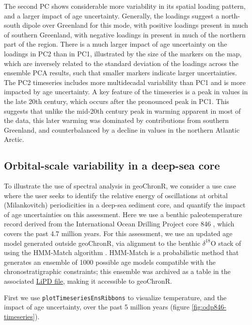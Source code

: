 \documentclass[gchron, manuscript]{copernicus}
\begin{document}
The second PC shows considerable more variability in its spatial loading pattern, and a larger impact of age uncertainty.
Generally, the loadings suggest a north-south dipole over Greenland for this mode, with positive loadings present in much of southern Greenland, with negative loadings in present in much of the northern part of the region.
There is a much larger impact of age uncertainty on the loadings in PC2 than in PC1, illustrated by the size of the markers on the map, which are inversely related to the standard deviation of the loadings across the ensemble PCA results, such that smaller markers indicate larger uncertainties.
The PC2 timeseries includes more multidecadal variability than PC1 and is more impacted by age uncertainty.
A key feature of the timeseries is a peak in values in the late 20th century, which occurs after the pronounced peak in PC1.
This suggests that unlike the mid-20th century peak in warming apparent in most of the data, this later warming was dominated by contributions from southern Greenland, and counterbalanced by a decline in values in the northern Atlantic Arctic.

\hypertarget{sec:spec_vignette}{%
\subsection{Orbital-scale variability in a deep-sea core}\label{sec:spec_vignette}}

To illustrate the use of spectral analysis in geoChronR, we consider a use case where the user seeks to identify the relative energy of oscillations at orbital (Milankovitch) periodicities in a deep-sea sediment core, and quantify the impact of age uncertainties on this assessment.
Here we use a benthic paleotemperature record derived from the International Ocean Drilling Project core 846 \citep{mix1995benthic, Shackleton95}, which covers the past 4.7 million years.
For this assessment, we use an updated age model generated outside geoChronR, via alignment to the benthic \(\delta^{18}\mathrm{O}\) stack of \citet{LisieckiRaymo05} using the HMM-Match algorithm \citep{ProbStack, khider2017}.
HMM-Match is a probabilistic method that generates an ensemble of 1000 possible age models compatible with the chronostratigraphic constraints; this ensemble was archived as a table in the associated \href{http://lipdverse.org/geoChronR-examples/ODP846.Lawrence.2006.lpd}{LiPD file}, making it accessible to geoChronR.

First we use \texttt{plotTimeseriesEnsRibbons} to visualize temperature, and the impact of age uncertainty, over the past 5 million years (figure \ref{fig:odp846-timeseries}).
\end{document}
